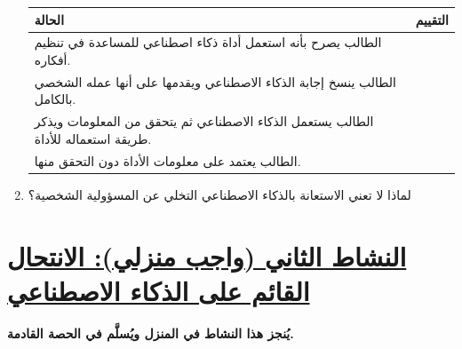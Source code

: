 \documentclass[a4paper]{article}
\begin{document}
\begin{enumerate}
\begin{center}

\begin{tabular}{|
>{\raggedleft\arraybackslash}m{9.5cm}|
>{\centering\arraybackslash}m{4cm}|}

\hline

\textbf{الحالة} & \textbf{التقييم} \\

\hline

الطالب يصرح بأنه استعمل أداة ذكاء اصطناعي
للمساعدة في تنظيم أفكاره.
&
\\[0.4cm]
\hline

الطالب ينسخ إجابة الذكاء الاصطناعي ويقدمها على أنها
عمله الشخصي بالكامل.
&
\\[0.4cm]
\hline

الطالب يستعمل الذكاء الاصطناعي ثم يتحقق من المعلومات
ويذكر طريقة استعماله للأداة.
&
\\[0.4cm]
\hline

الطالب يعتمد على معلومات الأداة دون التحقق منها.
&
\\[0.4cm]
\hline

\end{tabular}

\end{center}


\item لماذا لا تعني الاستعانة بالذكاء الاصطناعي
التخلي عن المسؤولية الشخصية؟

\end{enumerate}

\vspace{3cm}
\section*{\khatt\underline{النشاط الثاني (واجب منزلي): الانتحال القائم على الذكاء الاصطناعي}}

\textbf{يُنجز هذا النشاط في المنزل ويُسلَّم في الحصة القادمة.}
\end{document}
